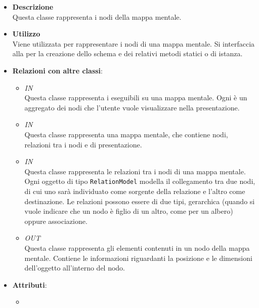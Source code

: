 \begin{itemize}
\item \textbf{Descrizione}\\
Questa classe rappresenta i nodi della mappa mentale.
\item \textbf{Utilizzo}\\
Viene utilizzata per rappresentare i nodi di una mappa mentale. Si interfaccia alla   per la creazione dello schema e dei relativi metodi statici o di istanza.
\item \textbf{Relazioni con altre classi}:
\begin{itemize}
\item \textit{IN} \hyperref[\nogloxy{Premi::Back-End::App::Models::PathModel}]{}\\
Questa classe rappresenta i  eseguibili su una mappa mentale. Ogni  è un aggregato dei nodi che l’utente vuole visualizzare nella presentazione.
\item \textit{IN} \hyperref[\nogloxy{Premi::Back-End::App::Models::ProjectModel}]{}\\
Questa classe rappresenta una mappa mentale, che contiene nodi, relazioni tra i nodi e  di presentazione.
\item \textit{IN} \hyperref[\nogloxy{Premi::Back-End::App::Models::RelationModel}]{}\\
Questa classe rappresenta le relazioni tra i nodi di una mappa mentale. Ogni oggetto di tipo \texttt{RelationModel} modella il collegamento tra due nodi, di cui uno sarà individuato come sorgente della relazione e l’altro come destinazione. Le relazioni possono essere di due tipi, gerarchica (quando si vuole indicare che un nodo è figlio di un altro, come per un albero) oppure associazione.
\item \textit{OUT} \hyperref[\nogloxy{Premi::Back-End::App::Models::NodeContentModel}]{}\\
Questa classe rappresenta gli elementi contenuti in un nodo della mappa mentale. Contiene le informazioni riguardanti la posizione e le dimensioni dell’oggetto all’interno del nodo.
\end{itemize}
\item \textbf{Attributi}:
\begin{itemize}
\item {}

\end{itemize}
\end{itemize}
